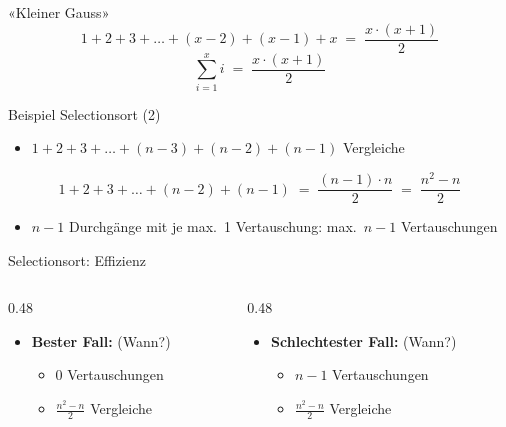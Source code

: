 \begin{frame}[text=large]{«Kleiner Gauss»}
  \vspace*{8mm}
  \[ 1 + 2 + 3 + \dots + (x-2) + (x-1) + x \;=\; \frac{x \cdot (x+1)}{2} \]
  \vspace{4mm}
  \[ \sum_{i=1}^{x} i \;=\; \frac{x \cdot (x+1)}{2} \]
\end{frame}

\begin{frame}{Beispiel Selectionsort (2)}
  \begin{itemize}
    \item $1 + 2 + 3 + \dots + (n-3) + (n-2) + (n-1)$ Vergleiche
  \end{itemize}
  \[ 1 + 2 + 3 + \dots + (n-2) + (n-1) \;=\; \frac{(n-1) \cdot n}{2} \;=\; \frac{n^2-n}{2} \]
  \begin{itemize}
    \item $n-1$ Durchgänge mit je max.~1 Vertauschung: max.~$n-1$ Vertauschungen
  \end{itemize}
\end{frame}

\begin{frame}[text=large]{Selectionsort: Effizienz}
  \begin{columns}[T,onlytextwidth]
    \begin{column}{0.48\textwidth}
      \begin{itemize}
        \item \textbf{Bester Fall:} (Wann?)
        \begin{itemize}
          \item 0 Vertauschungen
          \item $\frac{n^2-n}{2}$ Vergleiche
        \end{itemize}
      \end{itemize}
    \end{column}
    \begin{column}{0.48\textwidth}
      \begin{itemize}
        \item \textbf{Schlechtester Fall:} (Wann?)
        \begin{itemize}
          \item $n-1$ Vertauschungen
          \item $\frac{n^2-n}{2}$ Vergleiche
        \end{itemize}
      \end{itemize}
    \end{column}
  \end{columns}
\end{frame}


